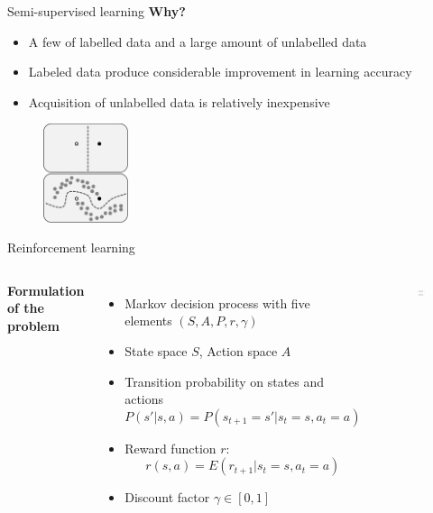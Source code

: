 \documentclass{beamer}
\begin{document}
\begin{frame}{Semi-supervised learning}
\textbf{Why?}
\begin{itemize}
\item A few of labelled data and  a large amount of unlabelled data
\item Labeled data produce considerable improvement in learning accuracy
\item Acquisition of unlabelled data is relatively inexpensive
\end{itemize}
\begin{figure}
\centering
\includegraphics[width=2.5cm]{ep14.png}
\end{figure}
\end{frame} 

\begin{frame}{Reinforcement learning}
\begin{columns}
\textbf{Formulation of the problem}
\begin{itemize}
\item Markov decision process with five elements $(S, A, P, r, \gamma)$
\item State space $S$, Action space $A$
\item Transition probability on states and actions
$$
P(s'|s, a)=P(s_{t+1} = s' | s_t = s, a_t = a)
$$
\item Reward function $r$: $$r(s, a) = E(r_{t+1}|s_t = s, a_t = a)$$
\item Discount factor $\gamma\in [0, 1]$
\end{itemize}
\begin{figure}
\centering
\includegraphics[width=3.2cm]{ep16.png}
\end{figure}
\end{columns}
\end{frame}
\end{document}
